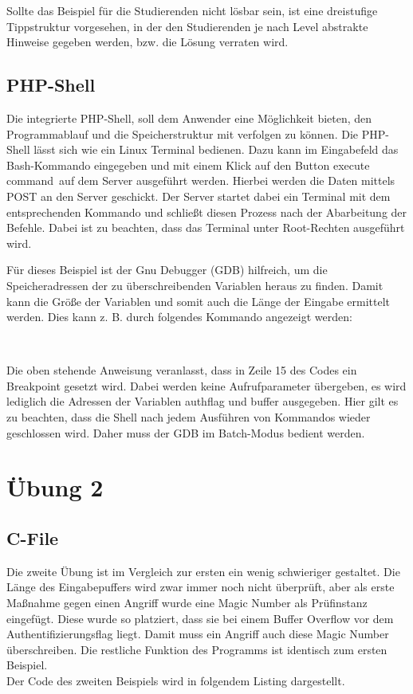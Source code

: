 Sollte das Beispiel für die Studierenden nicht lösbar sein, ist eine dreistufige Tippstruktur vorgesehen, in der den Studierenden je nach Level abstrakte Hinweise gegeben werden, bzw. die Lösung verraten wird.

\subsection{PHP-Shell}
Die integrierte PHP-Shell, soll dem Anwender eine Möglichkeit bieten, den Programmablauf und die Speicherstruktur mit verfolgen zu können. Die PHP-Shell lässt sich wie ein Linux Terminal bedienen. Dazu kann im Eingabefeld das Bash-Kommando eingegeben und mit einem Klick auf den Button \glqq execute command\grqq\, auf dem Server ausgeführt werden. Hierbei werden die Daten mittels POST an den Server geschickt. Der Server startet dabei ein Terminal mit dem entsprechenden Kommando und schließt diesen Prozess nach der Abarbeitung der Befehle. Dabei ist zu beachten, dass das Terminal unter Root-Rechten ausgeführt wird.\medskip

Für dieses Beispiel ist der Gnu Debugger (GDB) hilfreich, um die Speicheradressen der zu überschreibenden Variablen heraus zu finden. Damit kann die Größe der Variablen und somit auch die Länge der Eingabe ermittelt werden. Dies kann z. B. durch folgendes Kommando angezeigt werden:

\\ \medskip

Die oben stehende Anweisung veranlasst, dass in Zeile 15 des Codes ein Breakpoint gesetzt wird. Dabei werden keine Aufrufparameter übergeben, es wird lediglich die Adressen der Variablen authflag und buffer ausgegeben. Hier gilt es zu beachten, dass die Shell nach jedem Ausführen von Kommandos wieder geschlossen wird. Daher muss der GDB im Batch-Modus bedient werden. 

\section{Übung 2}
\subsection{C-File}
Die zweite Übung ist im Vergleich zur ersten ein wenig schwieriger gestaltet. Die Länge des Eingabepuffers wird zwar immer noch nicht überprüft, aber als erste Maßnahme gegen einen Angriff wurde eine Magic Number als Prüfinstanz eingefügt. Diese wurde so platziert, dass sie bei einem Buffer Overflow vor dem Authentifizierungsflag liegt. Damit muss ein Angriff auch diese Magic Number überschreiben. Die restliche Funktion des Programms ist identisch zum ersten Beispiel. \\
Der Code des zweiten Beispiels wird in folgendem Listing dargestellt.


